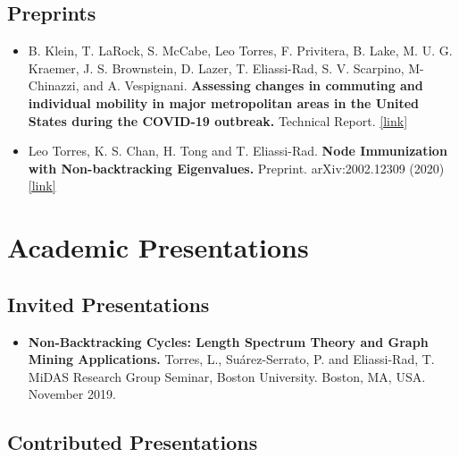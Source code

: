\documentclass[12pt,]{scrartcl}
\begin{document}
\subsection{Preprints}\label{preprints}

\begin{itemize}
\leftskip-0.25in %

\item B. Klein, T. LaRock, S. McCabe, Leo Torres, F. Privitera, B. Lake, M. U. G. Kraemer, J. S. Brownstein, D. Lazer, T. Eliassi-Rad, S. V. Scarpino, M- Chinazzi, and A. Vespignani. \textbf{Assessing changes in commuting and individual mobility in major metropolitan areas in the United States during the COVID-19 outbreak.} Technical Report. \href{https://www.mobs-lab.org/uploads/6/7/8/7/6787877/assessing_mobility_changes_in_the_united_states_during_the_covid_19_outbreak.pdf}{[link]}

\item Leo Torres, K. S. Chan, H. Tong and T. Eliassi-Rad. \textbf{Node Immunization with Non-backtracking Eigenvalues.} Preprint. arXiv:2002.12309 (2020) \href{https://arxiv.org/abs/2002.12309}{[link]}

\end{itemize}


\section{Academic Presentations}\label{presentations}

\subsection{Invited Presentations}\label{invited-presentations}

\begin{itemize}
\leftskip-0.25in %

\item \textbf{Non-Backtracking Cycles: Length Spectrum Theory and Graph Mining Applications.} Torres, L., Su\'arez-Serrato, P. and Eliassi-Rad, T. MiDAS Research Group Seminar, Boston University. Boston, MA, USA. November 2019.

\end{itemize}

\subsection{Contributed Presentations}\label{contributed-presentations}
\end{document}
